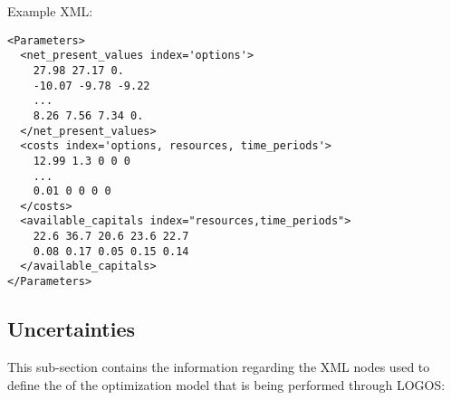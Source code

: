 Example XML:
\begin{lstlisting}[style=XML]
<Parameters>
  <net_present_values index='options'>
    27.98 27.17 0.
    -10.07 -9.78 -9.22
    ...
    8.26 7.56 7.34 0.
  </net_present_values>
  <costs index='options, resources, time_periods'>
    12.99 1.3 0 0 0
    ...
    0.01 0 0 0 0
  </costs>
  <available_capitals index="resources,time_periods">
    22.6 36.7 20.6 23.6 22.7
    0.08 0.17 0.05 0.15 0.14
  </available_capitals>
</Parameters>
\end{lstlisting}


%
\subsection{Uncertainties}
\label{subsec:Uncertainties}
This sub-section contains the information regarding the XML nodes used to define the
 of the optimization model that is being performed through LOGOS:
